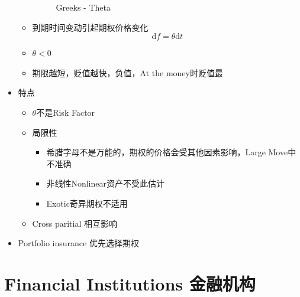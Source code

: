 \documentclass[a4paper,6pt,twoside,openany]{article}
\begin{document}
\begin{itemize}
\begin{itemize}
\begin{figure}[ht!]
      \caption{Greeks - Theta}
    \end{figure}
  \item 到期时间变动引起期权价格变化 $$\mathrm{d}f = \theta \mathrm{d}t$$
  \item $\theta < 0$
  \item 期限越短，贬值越快，负值，At the money时贬值最
  \end{itemize}
\item 特点
  \begin{itemize}
  \item $\theta$不是Risk Factor
  \item 局限性
    \begin{itemize}
    \item 希腊字母不是万能的，期权的价格会受其他因素影响，Large Move中不准确
    \item 非线性Nonlinear资产不受此估计
    \item Exotic奇异期权不适用
    \end{itemize}
  \item Cross paritial 相互影响
  \end{itemize}
\item Portfolio insurance 优先选择期权
\end{itemize}

\newpage

\section{Financial Institutions 金融机构}
\end{document}

